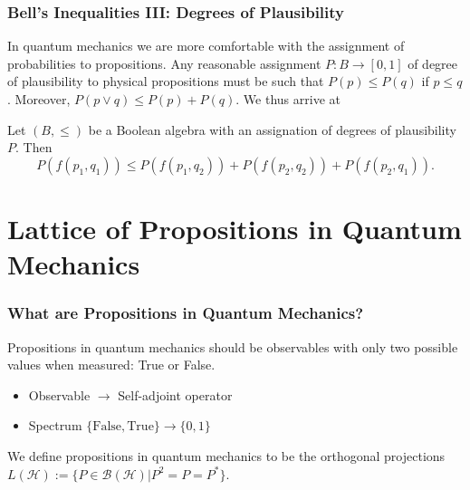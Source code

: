 \documentclass{beamer}
\begin{document}
\begin{frame}

	\frametitle{Bell's Inequalities III: Degrees of Plausibility}
	
	In quantum mechanics we are more comfortable with the assignment of probabilities to propositions\cite{Jaynes2003}. Any reasonable assignment $P:B\rightarrow [0,1]$ of degree of plausibility to physical propositions must be such that $P(p)\leq P(q)$ if $p\leq q$. Moreover, $P(p\vee q)\leq P(p)+P(q)$. We thus arrive at

	\begin{theorem}
	
		Let $(B,\leq)$ be a Boolean algebra with an assignation of degrees of plausibility $P$. Then
		\begin{equation}
			P(f(p_1,q_1))\leq P(f(p_1,q_2))+P(f(p_2,q_2))+P(f(p_2,q_1)).
		\end{equation}			
	
	\end{theorem}

\end{frame}

\section{Lattice of Propositions in Quantum Mechanics}

\begin{frame}

	\frametitle{What are Propositions in Quantum Mechanics?}
	
	Propositions in quantum mechanics should be observables with only two possible values when measured: True or False\cite{Wilce2012}.
	
	\begin{itemize}
	
		\item Observable $\rightarrow$ Self-adjoint operator
		
		\item Spectrum $\{\text{False},\text{True}\}\rightarrow\{0,1\}$	
	
	\end{itemize}
	
	\begin{definition}
	
		We define propositions in quantum mechanics to be the orthogonal projections $L(\mathcal{H}):=\{P\in\mathcal{B}(\mathcal{H})|P^2=P=P^*\}$.	
	
	\end{definition}

\end{frame}
	
\end{document}
